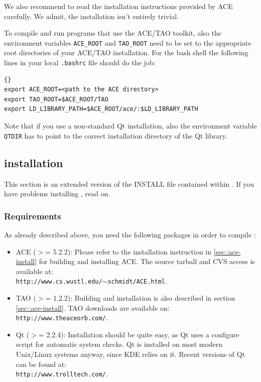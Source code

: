 \documentclass[10pt]{book}
\begin{document}
We also recommend to read the installation instructions provided
by ACE carefully. We admit, the installation isn't entirely trivial.

To compile and run programs that use the ACE/TAO toolkit, also the
environment variables {\tt ACE\_ROOT} and {\tt TAO\_ROOT} need
to be set to the appropriate root directories of your ACE/TAO
installation. For the bash shell the following lines in your local
{\tt .bashrc} file should do the job:

\begin{lstlisting}[frame=tb]{}
export ACE_ROOT=<path to the ACE directory>
export TAO_ROOT=$ACE_ROOT/TAO
export LD_LIBRARY_PATH=$ACE_ROOT/ace/:$LD_LIBRARY_PATH
\end{lstlisting}

Note that if you use a non-standard Qt installation, also the
environment variable \texttt{QTDIR} has to point to the correct
installation directory of the Qt library.

\subsection{\miro installation}

This section is an extended version of the INSTALL file contained
within \miro. If you have problems installing \miro, read on.

\subsubsection{Requirements}

As already described above, you need the following packages in order
to compile \miro:
\begin{itemize}
\item ACE ($>$= 5.2.2): Please refer to the installation instruction
  in \ref{sec::ace-install} for building and installing ACE. The source
  tarball and CVS access is available at:\\
  \texttt{http://www.cs.wustl.edu/$\sim$schmidt/ACE.html}.
\item TAO ($>$= 1.2.2): Building and installation is also described in
  section \ref{sec::ace-install}. TAO downloads are available on:\\
  \texttt{http://www.theaceorb.com/}.
\item Qt ($>$= 2.2.4): Installation should be quite easy, as Qt uses a
  configure script for automatic system checks. Qt is installed on
  most modern Unix/Linux systems anyway, since KDE relies on
  it. Recent versions of Qt can be found at:\\
  \texttt{http://www.trolltech.com/}.
\end{itemize}
\end{document}
